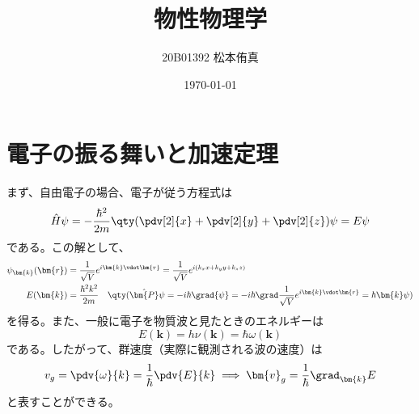 
\usepackage{nicematrix,nccmath}
\title{物性物理学}
\author{20B01392 松本侑真}
\date{\today}

\maketitle
\begin{abstract}

\end{abstract}
\tableofcontents
\newpage
\section{電子の振る舞いと加速定理}
まず、自由電子の場合、電子が従う方程式は
\begin{equation}
	\hat{H}\psi = -\frac{\hbar^2}{2m}\qty(\pdv[2]{x} + \pdv[2]{y} + \pdv[2]{z})\psi = E\psi
\end{equation}
である。この解として、
\begin{align}
	\psi_{\bm{k}}(\bm{r}) & = \frac{1}{\sqrt{V}}e^{i\bm{k}\vdot\bm{r}} = \frac{1}{\sqrt{V}}e^{i(k_xx + k_yy + k_zz)}                                                         \\
	E(\bm{k})             & = \frac{\hbar^2k^2}{2m}\quad\qty(\hat{\bm{P}}\psi = -i\hbar\grad{\psi} = -i\hbar\grad\frac{1}{\sqrt{V}}e^{i\bm{k}\vdot\bm{r}} = \hbar\bm{k}\psi)
\end{align}
を得る。また、一般に電子を物質波と見たときのエネルギーは
\begin{equation}
	E(\bm{k}) = h\nu(\bm{k}) = \hbar\omega(\bm{k})
\end{equation}
である。したがって、群速度（実際に観測される波の速度）は
\begin{equation}
	v_{g} = \pdv{\omega}{k} = \frac{1}{\hbar}\pdv{E}{k}\implies \bm{v}_g = \frac{1}{\hbar}\grad_{\bm{k}}E
\end{equation}
と表すことができる。
